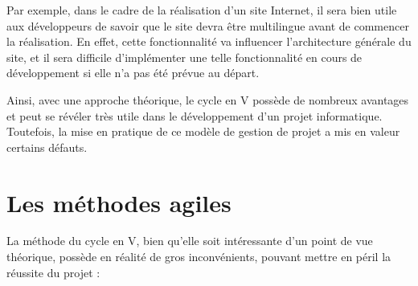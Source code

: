 Par exemple, dans le cadre de la réalisation d'un site Internet, il sera bien utile aux développeurs de savoir que le site devra être multilingue avant de commencer la réalisation. En effet, cette fonctionnalité va influencer l'architecture générale du site, et il sera difficile d'implémenter une telle fonctionnalité en cours de développement si elle n'a pas été prévue au départ.

Ainsi, avec une approche théorique, le cycle en V possède de nombreux avantages et peut se révéler très utile dans le développement d'un projet informatique. Toutefois, la mise en pratique de ce modèle de gestion de projet a mis en valeur certains défauts.

\section{Les méthodes agiles}

La méthode du cycle en V, bien qu'elle soit intéressante d'un point de vue théorique, possède en réalité de gros inconvénients, pouvant mettre en péril la réussite du projet :

